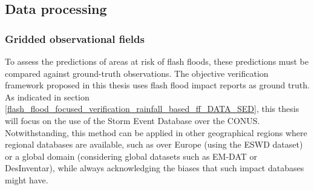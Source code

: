 \subsection{Data processing}

\subsubsection{Gridded observational fields}

To assess the predictions of areas at risk of flash floods, these predictions must be compared against ground-truth observations. The objective verification framework proposed in this thesis uses flash flood impact reports as ground truth. As indicated in section \ref{flash_flood_focused_verification_rainfall_based_ff_DATA_SED}, this thesis will focus on the use of the Storm Event Database over the CONUS. Notwithstanding, this method can be applied in other geographical regions where regional databases are available, such as over Europe (using the ESWD dataset) or a global domain (considering global datasets such as EM-DAT or DesInventar), while always acknowledging the biases that such impact databases might have. 

